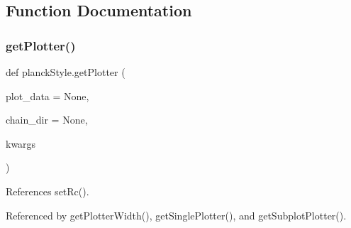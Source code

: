 \subsection{Function Documentation}
\mbox{\label{namespaceplanckStyle_a23e2fe4d18888ae3aa770201a9c07404}} 
\subsubsection{\texorpdfstring{get\+Plotter()}{getPlotter()}}
{\footnotesize\ttfamily def planck\+Style.\+get\+Plotter (\begin{DoxyParamCaption}\item[{}]{plot\+\_\+data = {\ttfamily None},  }\item[{}]{chain\+\_\+dir = {\ttfamily None},  }\item[{}]{kwargs }\end{DoxyParamCaption})}



References set\+Rc().



Referenced by get\+Plotter\+Width(), get\+Single\+Plotter(), and get\+Subplot\+Plotter().

